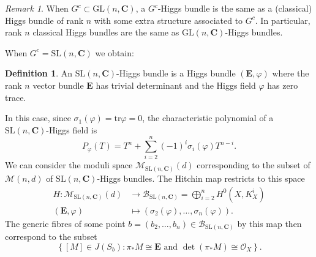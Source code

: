 \documentclass[12pt,a4paper]{book}
\theoremstyle{definition} \newtheorem{defn}[thm]{Definition}
\theoremstyle{definition} \newtheorem{ejemplo}[thm]{Example}
\theoremstyle{remark} \newtheorem{rem}[thm]{Remark}
\def\OO{\mathscr{O}}
\def\BB{\mathscr{B}}
\def\CC{\mathbf{C}}
\def\tr{\mathrm{tr}}
\def\SL{\mathrm{SL}}
\def\Hig{\mathscr{M}}
\def\SLHig{\mathscr{M}_{\SL(n,\CC)}}
\newcommand{\ve}[1]{\mathbf{#1}}
\begin{document}
\begin{rem}
  When $G^c\subset \mathrm{GL}(n,\CC)$, a $G^c$-Higgs bundle is the same as a (classical) Higgs bundle of rank $n$ with some extra structure associated to $G^c$. In particular, rank $n$ classical Higgs bundles are the same as $\mathrm{GL}(n,\CC)$-Higgs bundles.
\end{rem}

When $G^c=\SL(n,\CC)$ we obtain:
\begin{defn}
  An $\SL(n,\CC)$-Higgs bundle is a Higgs bundle $(\ve{E},\varphi)$ where the rank $n$ vector bundle $\ve{E}$ has trivial determinant and the Higgs field $\varphi$ has zero trace.
\end{defn}

In this case, since $\sigma_1(\varphi)=\tr \varphi=0$, the characteristic polynomial of a $\SL(n,\CC)$-Higgs field is
\begin{equation*}
  P_\varphi(T)=T^n + \sum_{i=2}^n (-1)^i\sigma_i(\varphi) T^{n-i}.
\end{equation*}
We can consider the moduli space $\SLHig(d)$ corresponding to the subset of $\Hig(n,d)$ of $\SL(n,\CC)$-Higgs bundles. The Hitchin map restricts to this space
\begin{align*}
  H :\SLHig(d)&\longrightarrow \BB_{\SL(n,\CC)}=\bigoplus_{i=2}^n H^0(X,K_X^i)\\ 
  (\ve{E},\varphi) &\longmapsto (\sigma_2(\varphi),\dots,\sigma_n(\varphi)). 
  \end{align*}
  The generic fibres of some point $b=(b_2,\dots,b_n)\in \BB_{\SL(n,\CC)}$ by this map then correspond to the subset
  \begin{equation*}
    \left\{ [M] \in J(S_b) : \pi_*M \cong \ve{E} \text{ and } \det(\pi_*M)\cong\OO_X  \right\}  . 
  \end{equation*}
\end{document}
